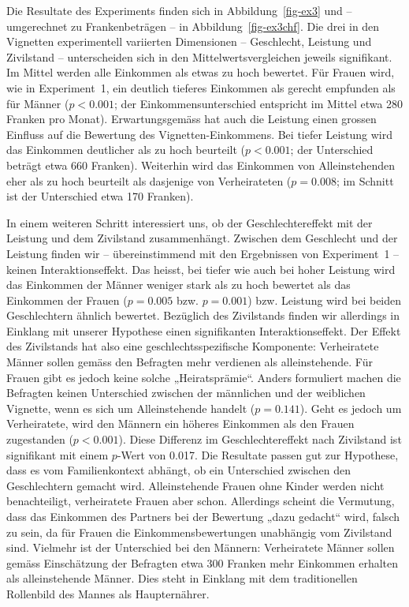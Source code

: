 \documentclass[a4paper,12pt]{article}
\begin{document}
Die Resultate des Experiments finden sich in Abbildung~\ref{fig-ex3} und –
umgerechnet zu Frankenbeträgen – in Abbildung~\ref{fig-ex3chf}. Die drei in den
Vignetten experimentell variierten Dimensionen -- Geschlecht, Leistung und
Zivilstand -- unterscheiden sich in den Mittelwertsvergleichen jeweils
signifikant. Im Mittel werden alle Einkommen als etwas zu hoch bewertet. Für
Frauen wird, wie in Experiment~1, ein deutlich tieferes Einkommen als gerecht
empfunden als für Männer ($p<0.001$; der Einkommensunterschied entspricht im
Mittel etwa 280 Franken pro Monat). Erwartungsgemäss hat auch die Leistung
einen grossen Einfluss auf die Bewertung des Vignetten-Einkommens. Bei tiefer
Leistung wird das Einkommen deutlicher als zu hoch beurteilt ($p<0.001$; der
Unterschied beträgt etwa 660 Franken). Weiterhin wird das Einkommen von
Alleinstehenden eher als zu hoch beurteilt als dasjenige von Verheirateten
($p=0.008$; im Schnitt ist der Unterschied etwa 170 Franken).

In einem weiteren Schritt interessiert uns, ob der Geschlechtereffekt mit der
Leistung und dem Zivilstand zusammenhängt. Zwischen dem Geschlecht und der
Leistung finden wir -- übereinstimmend mit den Ergebnissen von Experiment~1 --
keinen Interaktionseffekt. Das heisst, bei tiefer wie auch bei hoher Leistung
wird das Einkommen der Männer weniger stark als zu hoch bewertet als das
Einkommen der Frauen ($p=0.005$ bzw. $p=0.001$) bzw. Leistung wird bei beiden
Geschlechtern ähnlich bewertet. Bezüglich des Zivilstands finden wir allerdings
in Einklang mit unserer Hypothese einen signifikanten Interaktionseffekt. Der
Effekt des Zivilstands hat also eine geschlechtsspezifische Komponente:
Verheiratete Männer sollen gemäss den Befragten mehr verdienen als
alleinstehende. Für Frauen gibt es jedoch keine solche „Heiratsprämie“. Anders
formuliert machen die Befragten keinen Unterschied zwischen der männlichen und
der weiblichen Vignette, wenn es sich um Alleinstehende handelt ($p=0.141$).
Geht es jedoch um Verheiratete, wird den Männern ein höheres Einkommen als den
Frauen zugestanden ($p<0.001$). Diese Differenz im Geschlechtereffekt nach
Zivilstand ist signifikant mit einem $p$-Wert von 0.017. Die Resultate passen
gut zur Hypothese, dass es vom Familienkontext abhängt, ob ein Unterschied
zwischen den Geschlechtern gemacht wird. Alleinstehende Frauen ohne Kinder
werden nicht benachteiligt, verheiratete Frauen aber schon. Allerdings scheint
die Vermutung, dass das Einkommen des Partners bei der Bewertung „dazu gedacht“
wird, falsch zu sein, da für Frauen die Einkommensbewertungen unabhängig vom
Zivilstand sind. Vielmehr ist der Unterschied bei den Männern: Verheiratete
Männer sollen gemäss Einschätzung der Befragten etwa 300 Franken mehr Einkommen
erhalten als alleinstehende Männer. Dies steht in Einklang mit dem
traditionellen Rollenbild des Mannes als Haupternährer.
\end{document}
